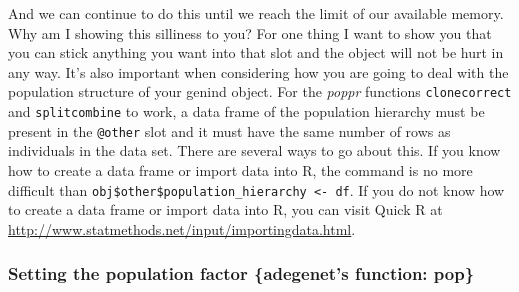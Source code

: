 \documentclass[letterpaper]{article}
\begin{document}
\begin{center}
\end{center}

And we can continue to do this until we reach the limit of our available memory. Why am I showing this silliness to you? For one thing I want to show you that you can stick anything you want into that slot and the object will not be hurt in any way. It's also important when considering how you are going to deal with the population structure of your genind object. For the \textit{poppr} functions \texttt{clonecorrect} and \texttt{splitcombine} to work, a data frame of the population hierarchy must be present in the \texttt{@other} slot and it must have the same number of rows as individuals in the data set. There are several ways to go about this. If you know how to create a data frame or import data into R, the command is no more difficult than \texttt{obj\$other\$population\_hierarchy <- df}. If you do not know how to create a data frame or import data into R, you can visit Quick R at \url{http://www.statmethods.net/input/importingdata.html}.
\subsubsection{Setting the population factor \{adegenet's function: pop\}}
\end{document}
